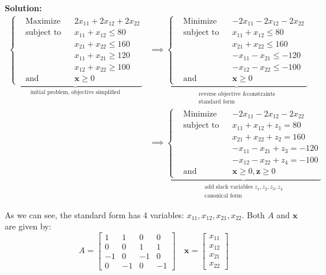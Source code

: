 \documentclass{article}
\renewcommand\vec{\mathbf}
\begin{document}
\noindent\textbf{Solution:} 
\begin{align*}
    \underbrace{\left\{\begin{aligned}
        &{\text{Maximize}}
        &&2x_{11}+2x_{12}+2x_{22}\\
        &{\text{subject to}}
        &&x_{11}+x_{12}\le80\\
        &
        &&x_{21}+x_{22}\le160\\
        &
        &&x_{11}+x_{21}\ge120\\
        &
        &&x_{12}+x_{22}\ge100\\
        &{\text{and}}
        &&\vec x\ge 0
    \end{aligned}\right.}_{\text{initial problem, objective simplified}}
    &\implies
    \underbrace{\left\{\begin{aligned}
        &{\text{Minimize}}
        &&-2x_{11}-2x_{12}-2x_{22}\\
        &{\text{subject to}}
        &&x_{11}+x_{12}\le80\\
        &
        &&x_{21}+x_{22}\le160\\
        &
        &&-x_{11}-x_{21}\le-120\\
        &
        &&-x_{12}-x_{22}\le-100\\
        &{\text{and}}
        &&\vec x\ge 0
    \end{aligned}\right.}_{\substack{\text{reverse objective \& constraints}\\\text{standard form}}}\\
    &\implies
    \underbrace{\left\{\begin{aligned}
        &{\text{Minimize}}
        &&-2x_{11}-2x_{12}-2x_{22}\\
        &{\text{subject to}}
        &&x_{11}+x_{12}+z_1=80\\
        &
        &&x_{21}+x_{22}+z_2=160\\
        &
        &&-x_{11}-x_{21}+z_3=-120\\
        &
        &&-x_{12}-x_{22}+z_4=-100\\
        &{\text{and}}
        &&\vec x\ge 0, \vec z\ge0
    \end{aligned}\right.}_{\substack{\text{add slack variables } z_1,z_2,z_3,z_4\\\text{canonical form}}}
\end{align*}

As we can see, the standard form has 4 variables: $x_{11},x_{12},x_{21},x_{22}$. Both $A$ and $\vec x$ are given by:
$$A=\begin{bmatrix}
    1&1&0&0\\0&0&1&1\\-1&0&-1&0\\0&-1&0&-1
\end{bmatrix}\quad \vec x=\begin{bmatrix}
    x_{11}\\x_{12}\\x_{21}\\x_{22}
\end{bmatrix}$$
\end{document}
